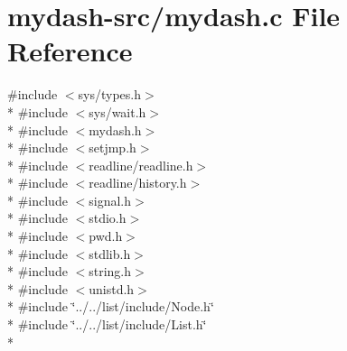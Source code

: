 \hypertarget{mydash-src_2mydash_8c}{\section{mydash-\/src/mydash.c File Reference}
\label{mydash-src_2mydash_8c}
}
{\ttfamily \#include $<$sys/types.\-h$>$}\\*
{\ttfamily \#include $<$sys/wait.\-h$>$}\\*
{\ttfamily \#include $<$mydash.\-h$>$}\\*
{\ttfamily \#include $<$setjmp.\-h$>$}\\*
{\ttfamily \#include $<$readline/readline.\-h$>$}\\*
{\ttfamily \#include $<$readline/history.\-h$>$}\\*
{\ttfamily \#include $<$signal.\-h$>$}\\*
{\ttfamily \#include $<$stdio.\-h$>$}\\*
{\ttfamily \#include $<$pwd.\-h$>$}\\*
{\ttfamily \#include $<$stdlib.\-h$>$}\\*
{\ttfamily \#include $<$string.\-h$>$}\\*
{\ttfamily \#include $<$unistd.\-h$>$}\\*
{\ttfamily \#include \char`\"{}../../list/include/\-Node.\-h\char`\"{}}\\*
{\ttfamily \#include \char`\"{}../../list/include/\-List.\-h\char`\"{}}\\*
